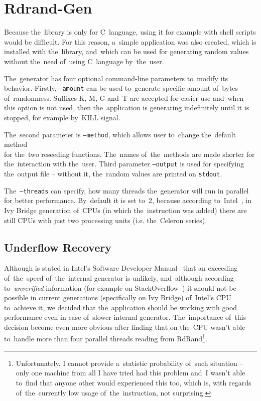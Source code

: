 
\chapter{Rdrand-Gen} \label{chap:generator}
\par{
Because the~library is only for C~language, using it for example with shell scripts would be difficult. For this reason, a~simple application was also created, which is installed with the~library, and~which can be used for generating random values without the~need of~using C~language by~the~user.
}

\par{
The~generator has four optional command-line parameters to~modify its behavior. Firstly, {\tt --amount} can be used to~generate specific amount of~bytes of~randomness. Suffixes K, M, G and~T are accepted for easier use and~when this option is not used, then the~application is generating indefinitely until it is stopped, for example by~KILL signal.
}

\par{
The~second parameter is {\tt --method}, which allows user to~change the~default method \\ for the~two reseeding functions. The~names of~the~methods are made shorter for the~interaction with the~user. Third parameter {\tt --output} is used for specifying the~output file -- without it, the~random values are printed on {\tt stdout}. 
}

\par{
The~{\tt --threads} can specify, how many threads the~generator will run in parallel for better performance. By~default it is set to~2, because according to~Intel~\cite{IntelArk}, in Ivy Bridge generation of~CPUs (in which the~instruction was added) there are still CPUs with just two processing units (i.e. the~Celeron series).
}

\section{Underflow Recovery}
\par{
Although is stated in Intel's Software Developer Manual~\cite[chapter~7.3.17]{IntelSWManualVol1} that an exceeding of~the~speed of~the~internal generator is unlikely, and~although according to~{\em unverified} information (for example on StackOverflow~\cite{StackoverflowRDRANDCharacteristics}) it should not be possible in current generations (specifically on Ivy Bridge) of~Intel's CPU to~achieve it, we decided that the~application should be working with good performance even in case of~slower internal generator. The~importance of~this decision become even more obvious after finding that on  the~CPU wasn't able to~handle more than four parallel threads reading from RdRand\footnote{Unfortunately, I cannot provide a~statistic probability of~such situation -- only one machine from all I have tried had this problem and~I wasn't able to~find that anyone other would experienced this too, which is, with regards of~the~currently low usage of~the~instruction, not surprising.}.
}

